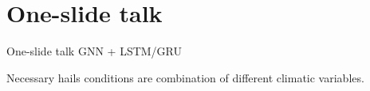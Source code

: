 \documentclass[10pt,pdf,hyperref={unicode}]{beamer}
\begin{document}
\section{One-slide talk }
\begin{frame}{One-slide talk }
GNN + LSTM/GRU

\begin{figure}[h]
\begin{minipage}[h]{0.49\linewidth}
\end{minipage}
\hfill
\begin{minipage}[h]{0.49\linewidth}
\end{minipage}
\end{figure}

Necessary hails conditions are combination of different climatic variables.
\end{frame}
\end{document}
